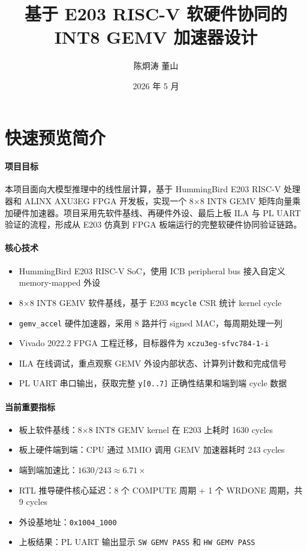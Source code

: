 \documentclass[12pt, a4paper]{article}
\title{基于 E203 RISC-V 软硬件协同的 INT8 GEMV 加速器设计}
\author{陈炯涛 董山}
\date{2026 年 5 月}
\begin{document}
\maketitle
\tableofcontents
\newpage
\setcounter{section}{-1}

\section{快速预览简介}
\label{sec:overview}

\paragraph{项目目标}
本项目面向大模型推理中的线性层计算，基于 HummingBird E203 RISC-V 处理器和 ALINX AXU3EG FPGA 开发板，实现一个 8$\times$8 INT8 GEMV 矩阵向量乘加硬件加速器。项目采用先软件基线、再硬件外设、最后上板 ILA 与 PL UART 验证的流程，形成从 E203 仿真到 FPGA 板端运行的完整软硬件协同验证链路。

\paragraph{核心技术}
\begin{itemize}
    \item HummingBird E203 RISC-V SoC，使用 ICB peripheral bus 接入自定义 memory-mapped 外设
    \item 8$\times$8 INT8 GEMV 软件基线，基于 E203 \texttt{mcycle} CSR 统计 kernel cycle
    \item \texttt{gemv\_accel} 硬件加速器，采用 8 路并行 signed MAC，每周期处理一列
    \item Vivado 2022.2 FPGA 工程迁移，目标器件为 \texttt{xczu3eg-sfvc784-1-i}
    \item ILA 在线调试，重点观察 GEMV 外设内部状态、计算列计数和完成信号
    \item PL UART 串口输出，获取完整 \texttt{y[0..7]} 正确性结果和端到端 cycle 数据
\end{itemize}

\paragraph{当前重要指标}
\begin{itemize}
    \item 板上软件基线：8$\times$8 INT8 GEMV kernel 在 E203 上耗时 1630 cycles
    \item 板上硬件端到端：CPU 通过 MMIO 调用 GEMV 加速器耗时 243 cycles
    \item 端到端加速比：$1630 / 243 \approx 6.71\times$
    \item RTL 推导硬件核心延迟：8 个 COMPUTE 周期 + 1 个 WRDONE 周期，共 9 cycles
    \item 外设基地址：\texttt{0x1004\_1000}
    \item 上板结果：PL UART 输出显示 \texttt{SW GEMV PASS} 和 \texttt{HW GEMV PASS}
\end{itemize}
\end{document}
